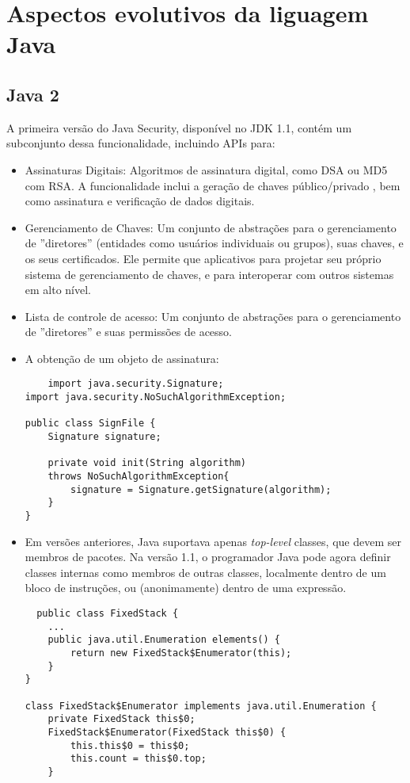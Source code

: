 \section {Aspectos evolutivos da liguagem Java}

\subsection {Java 2}
A primeira versão do Java Security, disponível no JDK 1.1, contém um subconjunto dessa funcionalidade, incluindo APIs para:
  \begin{itemize}
  \item Assinaturas Digitais: Algoritmos de assinatura digital, como DSA ou MD5 com RSA. A funcionalidade inclui a geração de chaves público/privado , bem como assinatura e verificação de dados digitais.
  \item Gerenciamento de Chaves: Um conjunto de abstrações para o gerenciamento de ''diretores'' (entidades como usuários individuais ou grupos), suas chaves, e os seus certificados. Ele permite que aplicativos para projetar seu próprio sistema de gerenciamento de chaves, e para interoperar com outros sistemas em alto nível.
  \item Lista de controle de acesso: Um conjunto de abstrações para o gerenciamento de ''diretores'' e suas permissões de acesso.
  \item A obtenção de um objeto de assinatura: 
  \begin{verbatim}
	import java.security.Signature;
import java.security.NoSuchAlgorithmException;

public class SignFile {
    Signature signature;

    private void init(String algorithm) 
    throws NoSuchAlgorithmException{
        signature = Signature.getSignature(algorithm);
    }
}
  \end{verbatim}
  \item Em versões anteriores, Java suportava apenas {\it top-level} classes, que devem ser membros de pacotes. Na versão 1.1, o programador Java pode agora definir classes internas como membros de outras classes, localmente dentro de um bloco de instruções, ou (anonimamente) dentro de uma expressão.
  \begin{verbatim}
  public class FixedStack {
    ...
    public java.util.Enumeration elements() {
        return new FixedStack$Enumerator(this);
    }
}

class FixedStack$Enumerator implements java.util.Enumeration {
    private FixedStack this$0;
    FixedStack$Enumerator(FixedStack this$0) {
        this.this$0 = this$0;
        this.count = this$0.top;
    }


\end{verbatim}
\end{itemize}

